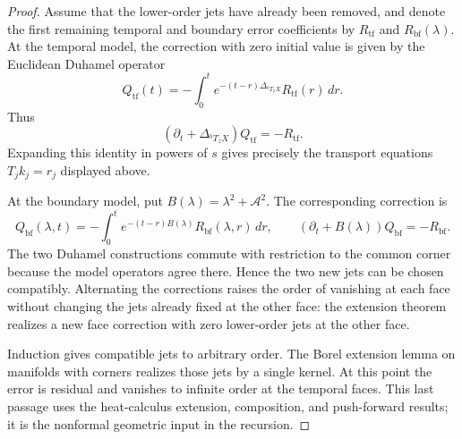 \documentclass[12pt,oneside,reqno]{article}
\theoremstyle{plain}
\theoremstyle{definition}
\theoremstyle{remark}
\begin{document}
\begin{proof}
Assume that the lower-order jets have already been removed, and denote the
first remaining temporal and boundary error coefficients by
\(R_{\mathrm{tf}}\) and \(R_{\mathrm{bf}}(\lambda)\).  At the temporal
model, the correction with zero initial value is given by the Euclidean
Duhamel operator
\[
 Q_{\mathrm{tf}}(t)
 =-
 \int_0^t
 e^{-(t-r)\Delta_{{}^bT_zX}}R_{\mathrm{tf}}(r)\,dr.
\]
Thus
\[
 (\partial_t+\Delta_{{}^bT_zX})Q_{\mathrm{tf}}
 =-R_{\mathrm{tf}}.
\]
Expanding this identity in powers of \(s\) gives precisely the transport
equations \(T_jk_j=r_j\) displayed above.

At the boundary model, put
\(B(\lambda)=\lambda^2+\mathcal A^2\).  The corresponding correction is
\[
 Q_{\mathrm{bf}}(\lambda,t)
 =-
 \int_0^t
 e^{-(t-r)B(\lambda)}R_{\mathrm{bf}}(\lambda,r)\,dr,
 \qquad
 (\partial_t+B(\lambda))Q_{\mathrm{bf}}
 =-R_{\mathrm{bf}}.
\]
The two Duhamel constructions commute with restriction to the common
corner because the model operators agree there.  Hence the two new jets
can be chosen compatibly.  Alternating the corrections raises the order of
vanishing at each face without changing the jets already fixed at the
other face: the extension theorem realizes a new face correction with
zero lower-order jets at the other face.

Induction gives compatible jets to arbitrary order.  The Borel extension
lemma on manifolds with corners realizes those jets by a single kernel.
At this point the error is residual and vanishes to infinite order at the
temporal faces.  This last passage uses the heat-calculus extension,
composition, and push-forward results; it is the nonformal geometric
input in the recursion.
\end{proof}
\end{document}
